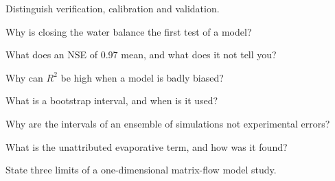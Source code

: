 \begin{exlist}
\item Distinguish verification, calibration and validation.
\item Why is closing the water balance the first test of a model?
\item What does an NSE of 0.97 mean, and what does it not tell you?
\item Why can $R^2$ be high when a model is badly biased?
\item What is a bootstrap interval, and when is it used?
\item Why are the intervals of an ensemble of simulations not experimental errors?
\item What is the unattributed evaporative term, and how was it found?
\item State three limits of a one-dimensional matrix-flow model study.
\end{exlist}
